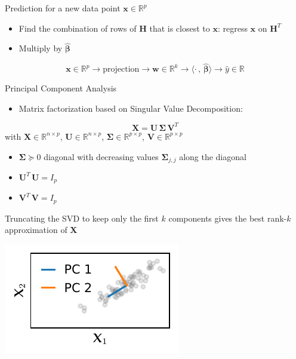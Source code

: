 \documentclass[presentation,mathserif,table]{beamer}
\newcommand{\X}{{\mathbold X}}
\newcommand{\bSigma}{{\mathbold \Sigma}}
\newcommand{\x}{{\mathbold x}}
\newcommand{\bbeta}{{\mathbold \beta}}
\newcommand{\U}{{\mathbold U}}
\newcommand{\V}{{\mathbold V}}
\newcommand{\bH}{{\mathbold H}}
\newcommand{\R}{\mathbb{R}}
\begin{document}
\begin{frame}[label={sec:orgcdac585}]{Prediction for a new data point \(\x \in \R^{p}\)}
\begin{itemize}
\item Find the combination of rows of \(\bH\) that is closest to \(\x\): regress \(\x\) on \(\bH^T\)
\item Multiply by \(\hat{\bbeta}\)
\end{itemize}
    \begin{equation}
\x \in \R^p \rightarrow \text{projection} \rightarrow \mathbold{w} \in \R^k \rightarrow \langle \cdot \, , \, \hat{\bbeta}\rangle \rightarrow \hat{y} \in \R
    \end{equation}
\end{frame}
\begin{frame}[label={sec:orge38a306}]{Principal Component Analysis}
\begin{itemize}
\item Matrix factorization based on Singular Value Decomposition:
\end{itemize}
\begin{equation}
\X = \U \, \bSigma \, \V^T
\end{equation}
with \(\X \in \R^{n \times p}\), \(\U \in \R^{n \times p}\), \(\bSigma \in \R^{p \times p}\), \(\V \in \R^{p \times p}\)
\begin{itemize}
\item \(\bSigma \succeq 0\) diagonal with decreasing values \(\bSigma_{j,j}\) along the diagonal
\item \(\U^T\, \U = I_p\)
\item \(\V^T\, \V = I_p\)
\end{itemize}

Truncating the SVD to keep only the first \(k\) components gives the best rank-\(k\) approximation of \(\X\)
\begin{center}
\includegraphics[height=.3\textheight]{figures/generated/pca/cloud_not_aligned_with_pc.pdf}
\end{center}
\end{frame}
\end{document}
